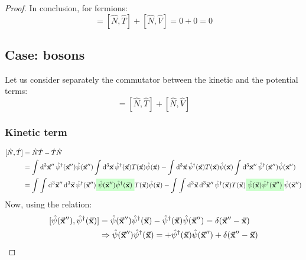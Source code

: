 \documentclass[11pt, a4paper, twoside, openright]{article}
\begin{document}
\begin{proof}
In conclusion, for fermions:
\begin{equation*}
  [\hat{N}, \hat{H}  ] = [\hat{N}, \hat{T}  ] + [\hat{N}, \hat{V}  ] = 0 + 0 = 0
\end{equation*}




\subsection*{Case: bosons}
Let us consider separately the commutator between the kinetic and the potential terms:
\begin{equation*}
  [\hat{N}, \hat{H}  ] = [\hat{N}, \hat{T}  ] + [\hat{N}, \hat{V}  ]
\end{equation*}

\subsubsection*{Kinetic term}
\begin{equation*}
\begin{split}
  [\hat{N},\hat{T}  ]&= \hat{N}\hat{T} - \hat{T}\hat{N} \\
  &=  \int_{}^{} \dd[3]{\va{x}''} \hat{\psi }^\dag (\va{x}'') \hat{\psi }(\va{x}'')
      \int_{}^{} \dd[3]{\va{x}} \hat{\psi } ^\dag  (\va{x}) T (\va{x}) \hat{\psi }(\va{x})
      -
      \int_{}^{} \dd[3]{\va{x}} \hat{\psi } ^\dag  (\va{x}) T (\va{x}) \hat{\psi }(\va{x})
      \int_{}^{} \dd[3]{\va{x}''} \hat{\psi }^\dag (\va{x}'') \hat{\psi }(\va{x}'') \\
  &= \int_{}^{} \int_{}^{} \dd[3]{\va{x}''} \dd[3]{\va{x}}  \hat{\psi }^\dag (\va{x}'') \mathcolorbox{green!20}{ \hat{\psi }(\va{x}'') \hat{\psi } ^\dag  (\va{x}) }  T (\va{x}) \hat{\psi }(\va{x})
      - \int_{}^{} \int_{}^{} \dd[3]{\va{x}} \dd[3]{\va{x}''} \hat{\psi } ^\dag  (\va{x}) T (\va{x}) \mathcolorbox{green!20}{ \hat{\psi }(\va{x}) \hat{\psi }^\dag (\va{x}'') } \hat{\psi }(\va{x}'')
\end{split}
\end{equation*}
Now, using the relation:
\begin{equation}
\begin{split}
  [ \hat{\psi } (\va{x}''), \hat{\psi }^\dag (\va{x}) ] &=   \hat{\psi } (\va{x}'') \hat{\psi }^\dag (\va{x}) -   \hat{\psi }^\dag (\va{x}) \hat{\psi } (\va{x}'') = \delta (\va{x}''-\va{x})  \\
  & \Rightarrow \hat{\psi } (\va{x}'') \hat{\psi }^\dag (\va{x}) = + \hat{\psi }^\dag (\va{x}) \hat{\psi } (\va{x}'') + \delta (\va{x}''-\va{x})

\end{split}
\end{equation}
\end{proof}
\end{document}
